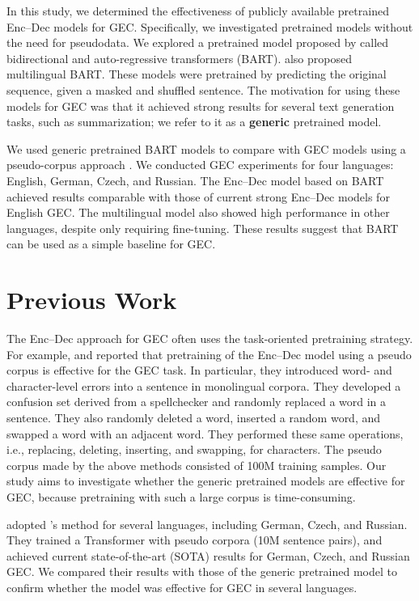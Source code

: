 \documentclass[11pt,a4paper]{article}
\begin{document}
In this study, we determined the effectiveness of publicly available pretrained Enc--Dec models for GEC.
Specifically, we investigated pretrained models without the need for pseudodata.
We explored a pretrained model proposed by \citet{bart} called bidirectional and auto-regressive transformers (BART).
\citet{m-bart} also proposed multilingual BART.
These models were pretrained by predicting the original sequence, given a masked and shuffled sentence.
The motivation for using these models for GEC was that it achieved strong results for several text generation tasks, such as summarization;
 we refer to it as a \textbf{generic} pretrained model.

We used generic pretrained BART models to compare with GEC models using a pseudo-corpus approach \cite{kiyono2019,kaneko_bert,low_resource_gec}.
We conducted GEC experiments for four languages: English, German, Czech, and Russian.
The Enc--Dec model based on BART achieved results comparable with those of current strong Enc--Dec models for English GEC.
The multilingual model also showed high performance in other languages, despite only requiring fine-tuning.
These results suggest that BART can be used as a simple baseline for GEC.

\section{Previous Work}
The Enc--Dec approach for GEC often uses the task-oriented pretraining strategy.
For example, \citet{copy_gec} and \citet{beasota} reported that pretraining of the Enc--Dec model using a pseudo corpus is effective for the GEC task.
In particular, they introduced word- and character-level errors into a sentence in monolingual corpora.
They developed a confusion set derived from a spellchecker and randomly replaced a word in a sentence.
They also randomly deleted a word, inserted a random word, and swapped a word with an adjacent word.
They performed these same operations, i.e., replacing, deleting, inserting, and swapping, for characters.
The pseudo corpus made by the above methods consisted of 100M training samples.
Our study aims to investigate whether the generic pretrained models are effective for GEC,
 because pretraining with such a large corpus is time-consuming.

\citet{low_resource_gec} adopted \citet{beasota}'s method for several languages, including German, Czech, and Russian.
They trained a Transformer \cite{attention} with pseudo corpora (10M sentence pairs), and
 achieved current state-of-the-art (SOTA) results for German, Czech, and Russian GEC.
We compared their results with those of the generic pretrained model
to confirm whether the model was effective for GEC in several languages.
\end{document}

